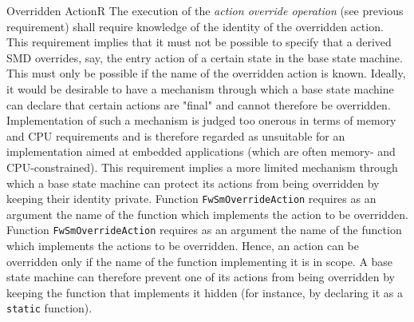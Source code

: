\documentclass[requirements]{../fwprofile}
\begin{document}
\begin{fw_req_note}{Overridden Action}{R}
{The execution of the \emph{action override operation} (see previous
requirement) shall require knowledge of the identity of the overridden action.}
{This requirement implies that it must not be possible to specify that a derived 
SMD overrides, say, the entry action of a certain state in the base state machine. 
This must only be possible if the name of the overridden action is known.}
{Ideally, it would be desirable to have a mechanism through which a base 
state machine can declare that certain actions are "final" and cannot therefore be overridden. 
Implementation of such a mechanism is judged too onerous in terms of memory and CPU requirements 
and is therefore regarded as unsuitable for an implementation aimed at embedded applications 
(which are often memory- and CPU-constrained). 
This requirement implies a more limited mechanism through which a base state machine can protect 
its actions from being overridden by keeping their identity private.}
{Function \texttt{FwSmOverrideAction} requires as an argument the name 
of the function which implements the action to be overridden.} 
{Function \texttt{FwSmOverrideAction} requires as an argument the name of 
the function which implements the actions to be overridden. 
Hence, an action can be overridden only if the name of the function implementing it is in scope. 
A base state machine can therefore prevent one of its actions from being overridden by keeping 
the function that implements it hidden (for instance, by declaring it as a \texttt{static} 
function).}
\end{fw_req_note}
\end{document}
